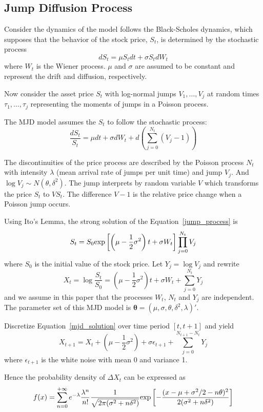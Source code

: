\documentclass[11pt,reqno,final]{amsart}
\def\exp{\hbox{\rm exp}}
\begin{document}
\subsection{Jump Diffusion Process}
Consider the dynamics of the model follows the Black-Scholes dynamics, which supposes
that the behavior of the stock price, $S_t$, is determined by the stochastic process
$$
dS_t = \mu S_t dt + \sigma S_t dW_t
$$
where $W_t$ is the Wiener process. $\mu$ and $\sigma$ are assumed to be constant and
represent the drift and diffusion, respectively.

Now consider the asset price $S_t$ with log-normal jumps $V_1, \ldots, V_j$ at random times
$\tau_1, \ldots, \tau_j$ representing the moments of jumps in a Poisson process.

The MJD model assumes the $S_t$ to follow the stochastic process:
\begin{equation} \label{jump_process}
\frac{dS_t}{S_t} = \mu dt + \sigma dW_t + d\left( \sum_{j=0}^{N_t}(V_j -1) \right)
\end{equation}

The discontinuities of the price process are described by the Poisson process $N_t$
with intensity $\lambda$ (mean arrival rate of jumps per unit time) and jump $V_j$.
And $\log V_j \sim N(\theta, \delta^2)$. The jump interprets by random variable $V$ which
transforms the price $S_t$ to $VS_t$. The difference $V-1$ is the relative price change when
a Poisson jump occurs.

Using Ito's Lemma, the strong solution of the Equation~\ref{jump_process} is
$$
S_t = S_0 \exp\left[\left( \mu - \frac{1}{2} \sigma^2 \right)t + \sigma W_t \right] \prod_{j=0}^{N_t} V_j
$$
where $S_0$ is the initial value of the stock price. Let $Y_j = \log V_j$ and rewrite
\begin{equation} \label{mjd_solution}
X_t = \log\frac{S_t}{S_0} = \left(\mu-\frac{1}{2} \sigma^2 \right)t + \sigma W_t + \sum_{j=0}^{N_t}Y_j
\end{equation}
and we assume in this paper that the processes $W_t$, $N_t$ and $Y_j$ are independent. The parameter set
of this MJD model is $\mathbf{\theta}=(\mu, \sigma, \theta, \delta^2, \lambda)'$.

Discretize Equation~\ref{mjd_solution} over time period $[t, t+1]$ and yield
$$
X_{t+1} = X_t + \left( \mu - \frac{1}{2}\sigma^2 \right) + \sigma \epsilon_{t+1} + \sum_{j=0}^{N_{t+1}-N_{t}}Y_j
$$
where $\epsilon_{t+1}$ is the white noise with mean 0 and variance 1.

Hence the probability density of $\Delta X_t$ can be expressed as
$$
f(x) = \sum_{n=0}^{+\infty} e^{-\lambda}\frac{\lambda^n}{n!} \frac{1}{\sqrt{2\pi(\sigma^2+n\delta^2)}} \exp\left[ -\frac{(x-\mu+\sigma^2/2 -n\theta)^2}{2(\sigma^2+n\delta^2)} \right]
$$
\end{document}
